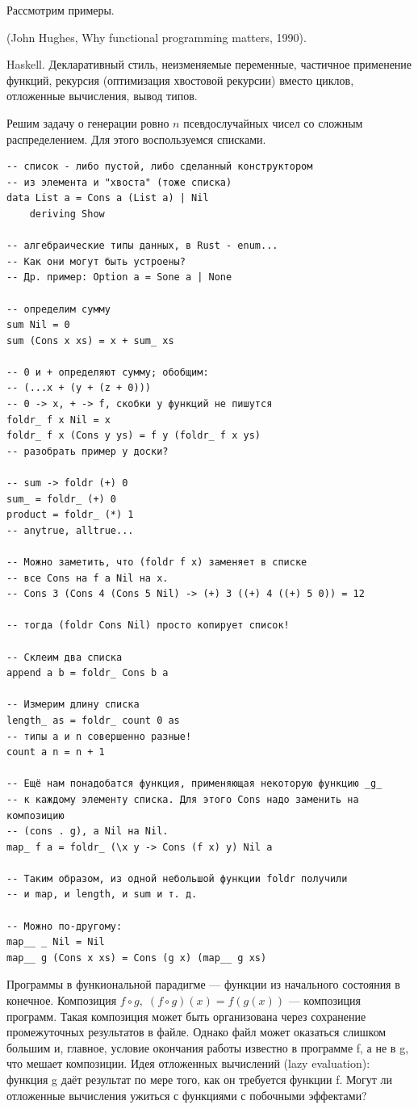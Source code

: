 \documentclass{book}
\begin{document}
Рассмотрим примеры.

(John Hughes, Why functional programming matters, 1990).

Haskell. Декларативный стиль, неизменяемые переменные, частичное применение функций, рекурсия
(оптимизация хвостовой рекурсии) вместо циклов, отложенные вычисления, вывод типов.

Решим задачу о генерации ровно $n$ псевдослучайных чисел со сложным распределением. Для этого
воспользуемся списками.

\begin{verbatim}
-- список - либо пустой, либо сделанный конструктором
-- из элемента и "хвоста" (тоже списка)
data List a = Cons a (List a) | Nil
    deriving Show

-- алгебраические типы данных, в Rust - enum...
-- Как они могут быть устроены?
-- Др. пример: Option a = Sone a | None

-- определим сумму
sum Nil = 0
sum (Cons x xs) = x + sum_ xs

-- 0 и + определяют сумму; обобщим:
-- (...x + (y + (z + 0)))
-- 0 -> x, + -> f, скобки у функций не пишутся
foldr_ f x Nil = x
foldr_ f x (Cons y ys) = f y (foldr_ f x ys)
-- разобрать пример у доски?

-- sum -> foldr (+) 0
sum_ = foldr_ (+) 0
product = foldr_ (*) 1
-- anytrue, alltrue...

-- Можно заметить, что (foldr f x) заменяет в списке
-- все Cons на f а Nil на x.
-- Cons 3 (Cons 4 (Cons 5 Nil) -> (+) 3 ((+) 4 ((+) 5 0)) = 12

-- тогда (foldr Cons Nil) просто копирует список!

-- Склеим два списка
append a b = foldr_ Cons b a

-- Измерим длину списка
length_ as = foldr_ count 0 as
-- типы a и n совершенно разные!
count a n = n + 1

-- Ещё нам понадобатся функция, применяющая некоторую функцию _g_
-- к каждому элементу списка. Для этого Cons надо заменить на композицию
-- (cons . g), а Nil на Nil.
map_ f a = foldr_ (\x y -> Cons (f x) y) Nil a

-- Таким образом, из одной небольшой функции foldr получили
-- и map, и length, и sum и т. д.

-- Можно по-другому:
map__ _ Nil = Nil
map__ g (Cons x xs) = Cons (g x) (map__ g xs)
\end{verbatim}

Программы в функиональной парадигме --- функции из начального состояния в конечное. Композиция $f
\circ g, \; (f \circ g)(x) = f(g(x))$ --- композиция программ. Такая композиция может быть
организована через сохранение промежуточных результатов в файле. Однако файл может оказаться
слишком большим и, главное, условие окончания работы известно в программе f, а не в g, что мешает
композиции. Идея отложенных вычислений (lazy evaluation): функция g даёт результат по мере того,
как он требуется функции f. Могут ли отложенные вычисления ужиться с функциями с побочными
эффектами?
\end{document}
